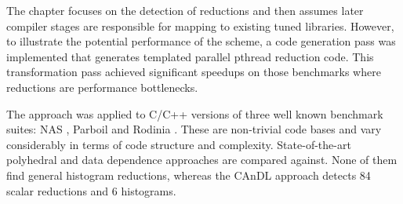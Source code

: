     The chapter focuses on the detection of reductions and then assumes later
    compiler stages are responsible for mapping to existing tuned libraries.
    However, to illustrate the potential performance of the scheme, a code
    generation pass was implemented that generates templated parallel pthread
    reduction code.
    This transformation pass achieved significant speedups on those benchmarks
    where reductions are performance bottlenecks.

    The approach was applied to C/C++ versions of three well known benchmark
    suites:
    NAS \cite{seo2011performance},
    Parboil \cite{stratton2012parboil} and
    Rodinia \cite{Che2009Rodinia}.
    These are non-trivial code bases and vary considerably in terms of code
    structure and complexity.
    State-of-the-art polyhedral and data dependence approaches are compared
    against.
    None of them find general histogram reductions, whereas the CAnDL approach
    detects 84 scalar reductions and 6 histograms.

%
%

